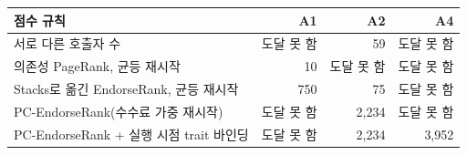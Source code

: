 \begin{tabular}{@{}lrrr@{}}
\toprule
점수 규칙 & A1 & A2 & A4 \\
\midrule
서로 다른 호출자 수 & 도달 못 함 & 59 & 도달 못 함 \\
의존성 PageRank, 균등 재시작 & 10 & 도달 못 함 & 도달 못 함 \\
Stacks로 옮긴 EndorseRank, 균등 재시작 & 750 & 75 & 도달 못 함 \\
PC-EndorseRank(수수료 가중 재시작) & 도달 못 함 & 2,234 & 도달 못 함 \\
PC-EndorseRank + 실행 시점 trait 바인딩 & 도달 못 함 & 2,234 & 3,952 \\
\bottomrule
\end{tabular}
